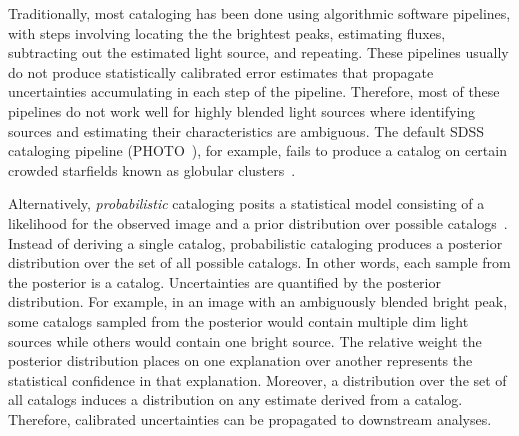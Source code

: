 
\bigbreak


Traditionally, most cataloging has been done using algorithmic software pipelines, with steps involving locating the the brightest peaks, estimating fluxes, subtracting out the estimated light source, and repeating.
These pipelines usually do not produce statistically calibrated error estimates that propagate 
uncertainties accumulating in each step of the pipeline. 
Therefore, most of these pipelines do not work well for highly blended light sources where identifying sources and estimating their characteristics are ambiguous. 
The default SDSS cataloging pipeline (PHOTO~\cite{lupton2001sdss}), for example, fails to 
produce a catalog on certain crowded starfields known as globular clusters~\cite{Portillo_2017}. 

Alternatively, {\itshape probabilistic} cataloging posits a statistical model consisting of a likelihood for the observed image and a prior distribution over possible catalogs~\cite{Brewer_2013, Portillo_2017, Feder_2019}. 
Instead of deriving a single catalog, probabilistic cataloging produces a posterior distribution over the set of all possible catalogs. 
In other words, each sample from the posterior is a catalog. 
Uncertainties are quantified by the posterior distribution. 
For example, in an image with an ambiguously blended bright peak, some catalogs sampled from the posterior would contain multiple dim light sources while others would contain one bright source. 
The relative weight the posterior distribution places on one explanation over another represents the statistical confidence in that explanation. 
Moreover, a distribution over the set of all catalogs induces a distribution on any estimate derived from a catalog. Therefore, calibrated uncertainties can be propagated to downstream analyses.  


